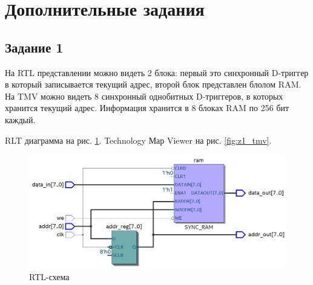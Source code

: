 \documentclass[a4paper,14pt]{article}
\begin{document}
	\section{Дополнительные задания}
	
	\subsection{Задание 1}
	
	На RTL представлении можно видеть 2 блока: первый это синхронный D-триггер в который записывается текущий адрес, второй блок представлен блолом RAM. На TMV можно видеть 8 синхронный однобитных D-триггеров, в которых хранится текущий адрес. Информация хранится в 8 блоках RAM по 256 бит каждый.
	
	RLT диаграмма на рис. \ref{fig:z1_rtl}. Technology Мар Viewer на рис. \ref{fig:z1_tmv}.
	 
	\begin{figure}[H]
		\centering
		\includegraphics[width=\linewidth]{images/z1_rtl}
		\caption{RTL-схема}
		\label{fig:z1_rtl}
	\end{figure}
\end{document}
